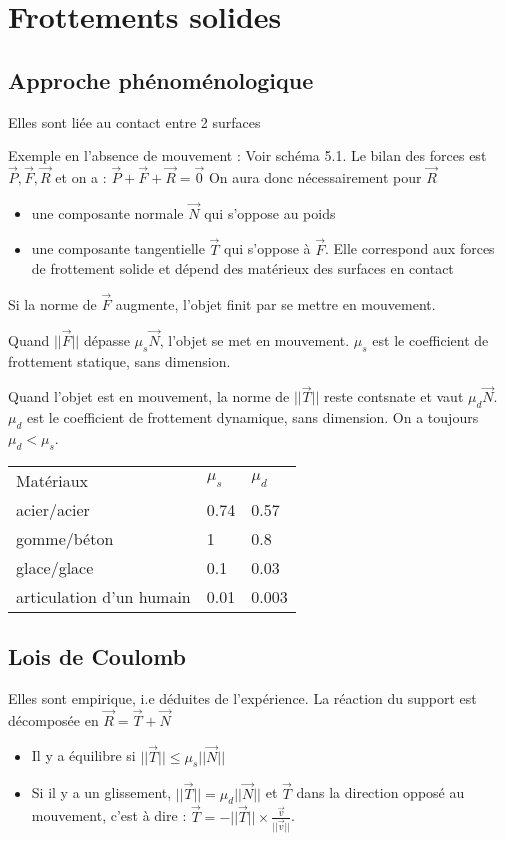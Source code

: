 \documentclass[french]{yLectureNote}
\renewcommand{\vec}{\overrightarrow}
\newcommand{\norm}[1]{||\vec{#1}||}
\begin{document}
\section{Frottements solides}
\subsection{Approche phénoménologique}
\begin{theorem}[Définition]
Elles sont liée au contact entre 2 surfaces
\end{theorem}
Exemple en l'absence de mouvement : Voir schéma 5.1. Le bilan des forces est $\vec{P},\vec{F},\vec{R}$ et on a : $\vec{P}+\vec{F}+\vec{R} = \vec{0}$ On aura donc nécessairement pour $\vec{R}$
\begin{itemize}
 \item une composante normale $\vec{N}$ qui s'oppose au poids
 \item une composante tangentielle $\vec{T}$ qui s'oppose à $\vec{F}$. Elle correspond aux forces de frottement solide et dépend des matérieux des surfaces en contact
\end{itemize}
Si la norme de $\vec{F}$ augmente, l'objet finit par se mettre en mouvement.

Quand $\norm{F}$ dépasse $\mu_s\vec{N}$, l'objet se met en mouvement. $\mu_s$ est le coefficient de frottement statique, sans dimension.

Quand l'objet est en mouvement, la norme de $\norm{T}$ reste contsnate et vaut $\mu_d\vec{N}$. $\mu_d$ est le coefficient de frottement dynamique, sans dimension. On a toujours $\mu_d<\mu_s$.
\begin{center}
\begin{tabular}{lll}
Matériaux & $\mu_s$ & $\mu_d$\\
acier/acier & 0.74 & 0.57\\
gomme/béton & 1 & 0.8\\
glace/glace & 0.1 & 0.03\\
articulation d'un humain & 0.01 & 0.003
\end{tabular}
\end{center}
\subsection{Lois de Coulomb}
Elles sont empirique, i.e déduites de l'expérience. La réaction du support est décomposée en $\vec{R} = \vec{T}+\vec{N}$
\begin{theorem}[Lois]
\begin{itemize}
 \item Il y a équilibre si $\norm{T} \leq \mu_s \norm{N}$
 \item Si il y a un glissement, $\norm{T} = \mu_d \norm{N}$ et $\vec{T}$ dans la direction opposé au mouvement, c'est à dire : $\vec{T} = -\norm{T}\times \frac{\vec{v}}{\norm{v}}$.
\end{itemize}
\end{theorem}
\end{document}
